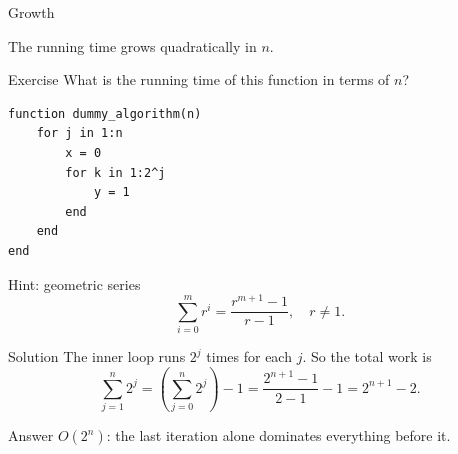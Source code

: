 \documentclass[10pt,aspectratio=169]{beamer}
\begin{document}
\begin{frame}{Growth}

  \begin{center}
  \end{center}

  \begin{center}
    The running time grows \alert{quadratically} in $n$.
  \end{center}
\end{frame}

\begin{frame}[fragile]{Exercise}
  What is the running time of this function in terms of $n$?

  \begin{lstlisting}
function dummy_algorithm(n)
    for j in 1:n
        x = 0
        for k in 1:2^j
            y = 1
        end
    end
end
  \end{lstlisting}

  \begin{block}{Hint: geometric series}
    \[
      \sum_{i=0}^{m} r^i = \frac{r^{m+1}-1}{r-1}, \quad r \neq 1.
    \]
  \end{block}
\end{frame}

\begin{frame}{Solution}
  The inner loop runs $2^j$ times for each $j$. So the total work is
  \[
    \sum_{j=1}^{n} 2^j
    = \left(\sum_{j=0}^{n} 2^j\right) - 1
    = \frac{2^{n+1}-1}{2-1} - 1
    = 2^{n+1} - 2.
  \]

  \bigskip
  \begin{alertblock}{Answer}
    $O(2^n)$: the last iteration alone dominates everything before it.
  \end{alertblock}
\end{frame}
\end{document}
